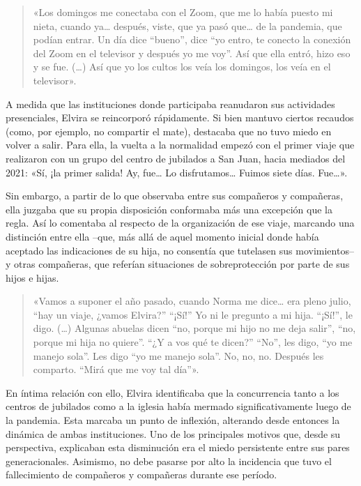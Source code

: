 \begin{quote}
«Los domingos me conectaba con el Zoom, que me lo había puesto mi nieta, cuando ya\ldots{} después, viste, que ya pasó que\ldots{} de la pandemia, que podían entrar. Un día dice ``bueno'', dice ``yo entro, te conecto la conexión del Zoom en el televisor y después yo me voy''. Así que ella entró, hizo eso y se fue. (\ldots) Así que yo los cultos los veía los domingos, los veía en el televisor».
\end{quote}

A medida que las instituciones donde participaba reanudaron sus actividades presenciales, Elvira se reincorporó rápidamente. Si bien mantuvo ciertos recaudos (como, por ejemplo, no compartir el mate), destacaba que no tuvo miedo en volver a salir. Para ella, la vuelta a la normalidad empezó con el primer viaje que realizaron con un grupo del centro de jubilados a San Juan, hacia mediados del 2021: «Sí, ¡la primer salida! Ay, fue\ldots{} Lo disfrutamos\ldots{} Fuimos siete días. Fue\ldots».

Sin embargo, a partir de lo que observaba entre sus compañeros y compañeras, ella juzgaba que su propia disposición conformaba más una excepción que la regla. Así lo comentaba al respecto de la organización de ese viaje, marcando una distinción entre ella --que, más allá de aquel momento inicial donde había aceptado las indicaciones de su hija, no consentía que tutelasen sus movimientos-- y otras compañeras, que referían situaciones de sobreprotección por parte de sus hijos e hijas.

\begin{quote}
«Vamos a suponer el año pasado, cuando Norma me dice\ldots{} era pleno julio, ``hay un viaje, ¿vamos Elvira?'' ``¡Sí!'' Yo ni le pregunto a mi hija. ``¡Sí!'', le digo. (\ldots) Algunas abuelas dicen ``no, porque mi hijo no me deja salir'', ``no, porque mi hija no quiere''. ``¿Y a vos qué te dicen?'' ``No'', les digo, ``yo me manejo sola''. Les digo ``yo me manejo sola''. No, no, no. Después les comparto. ``Mirá que me voy tal día''».
\end{quote}

En íntima relación con ello, Elvira identificaba que la concurrencia tanto a los centros de jubilados como a la iglesia había mermado significativamente luego de la pandemia. Esta marcaba un punto de inflexión, alterando desde entonces la dinámica de ambas instituciones. Uno de los principales motivos que, desde su perspectiva, explicaban esta disminución era el miedo persistente entre sus pares generacionales. Asimismo, no debe pasarse por alto la incidencia que tuvo el fallecimiento de compañeros y compañeras durante ese período.

